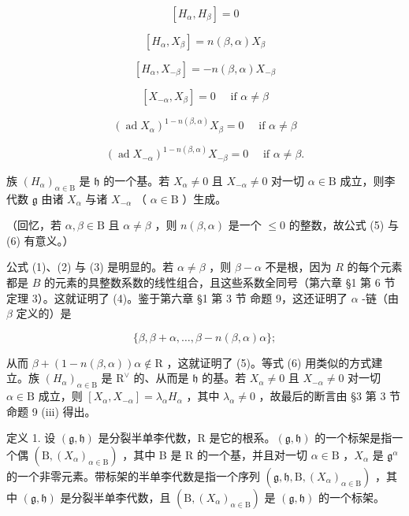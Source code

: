 \[
[ H _ {\alpha}, H _ {\beta} ] = 0\tag{1}
\]

\[
[ H _ {\alpha}, X _ {\beta} ] = n (\beta , \alpha) X _ {\beta}\tag{2}
\]

\[
[ H _ {\alpha}, X _ {- \beta} ] = - n (\beta , \alpha) X _ {- \beta}\tag{3}
\]

\[
[ X _ {- \alpha}, X _ {\beta} ] = 0 \quad \text { if } \alpha \neq \beta\tag{4}
\]

\[
(\operatorname{ad} X _ {\alpha}) ^ {1 - n (\beta , \alpha)} X _ {\beta} = 0 \quad \text { if } \alpha \neq \beta\tag{5}
\]

\[
(\operatorname{ad} X _ {- \alpha}) ^ {1 - n (\beta , \alpha)} X _ {- \beta} = 0 \quad \text { if } \alpha \neq \beta .\tag{6}
\]

族 \((H_{\alpha})_{\alpha \in \mathrm{B}}\) 是 \(\mathfrak{h}\) 的一个基。若 \(X_{\alpha} \neq 0\) 且 \(X_{-\alpha} \neq 0\) 对一切 \(\alpha \in \mathrm{B}\) 成立，则李代数 \(\mathfrak{g}\) 由诸 \(X_{\alpha}\) 与诸 \(X_{-\alpha}\) （ \(\alpha \in \mathrm{B}\) ）生成。

（回忆，若 \(\alpha, \beta \in \mathrm{B}\) 且 \(\alpha \neq \beta\) ，则 \(n(\beta, \alpha)\) 是一个 \(\leq 0\) 的整数，故公式 (5) 与 (6) 有意义。）

公式 (1)、(2) 与 (3) 是明显的。若 \(\alpha \neq \beta\) ，则 \(\beta - \alpha\) 不是根，因为 \(R\) 的每个元素都是 \(B\) 的元素的具整数系数的线性组合，且这些系数全同号（第六章 §1 第 6 节 定理 3）。这就证明了 (4)。鉴于第六章 §1 第 3 节 命题 9，这还证明了 \(\alpha\) -链（由 \(\beta\) 定义的）是

\[
\{\beta , \beta + \alpha , \dots , \beta - n (\beta , \alpha) \alpha \};
\]

从而 \(\beta + (1 - n(\beta, \alpha))\alpha \notin \mathrm{R}\) ，这就证明了 (5)。等式 (6) 用类似的方式建立。族 \((H_{\alpha})_{\alpha \in \mathrm{B}}\) 是 \(\mathrm{R}^{\vee}\) 的、从而是 \(\mathfrak{h}\) 的基。若 \(X_{\alpha} \neq 0\) 且 \(X_{-\alpha} \neq 0\) 对一切 \(\alpha \in \mathrm{B}\) 成立，则 \([X_{\alpha}, X_{-\alpha}] = \lambda_{\alpha}H_{\alpha}\) ，其中 \(\lambda_{\alpha} \neq 0\) ，故最后的断言由 §3 第 3 节 命题 9 (iii) 得出。

定义 1. 设 \((\mathfrak{g},\mathfrak{h})\) 是分裂半单李代数，R 是它的根系。\((\mathfrak{g},\mathfrak{h})\) 的一个标架是指一个偶 \((\mathrm{B},(X_{\alpha})_{\alpha \in \mathrm{B}})\) ，其中 B 是 R 的一个基，并且对一切 \(\alpha \in \mathrm{B}\) ，\(X_{\alpha}\) 是 \(\mathfrak{g}^{\alpha}\) 的一个非零元素。带标架的半单李代数是指一个序列 \((\mathfrak{g},\mathfrak{h},\mathrm{B},(X_{\alpha})_{\alpha \in \mathrm{B}})\) ，其中 \((\mathfrak{g},\mathfrak{h})\) 是分裂半单李代数，且 \((\mathrm{B},(X_{\alpha})_{\alpha \in \mathrm{B}})\) 是 \((\mathfrak{g},\mathfrak{h})\) 的一个标架。

